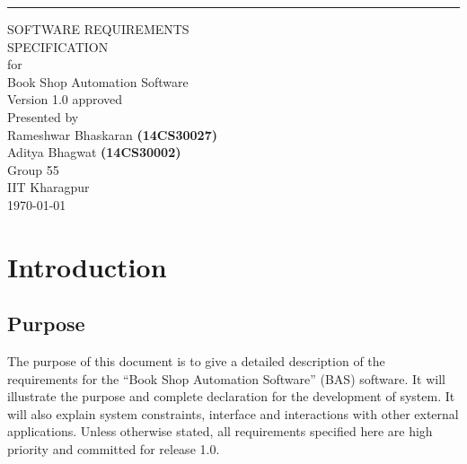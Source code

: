 \documentclass{scrreprt}
\date{}
\def\myversion{1.0 }
\begin{document}
\begin{flushright}
    \rule{16cm}{5pt}\vskip1cm
    \begin{bfseries}
        \Huge{SOFTWARE REQUIREMENTS\\ SPECIFICATION}\\
        \vspace{1.9cm}
        for\\
        \vspace{1.9cm}
        Book Shop Automation Software\\
        \vspace{1.9cm}
        \LARGE{Version \myversion approved}\\
        \vspace{1.8cm}
        Presented by\\
        \vspace{0.5cm}
        Rameshwar Bhaskaran \textbf{(14CS30027)} \\
        Aditya Bhagwat \textbf{(14CS30002)} \\
		Group 55 \\        
        \vspace{1.3cm}
        IIT Kharagpur\\    
       
        \today\\
    \end{bfseries}
\end{flushright}

\tableofcontents



\chapter{Introduction}

\section{Purpose}
The purpose of this document is to give a detailed description of the requirements for the “Book Shop Automation Software” (BAS) software. It will illustrate the purpose and complete declaration for the
 development of system. It will also explain system constraints, interface and interactions with other external applications. Unless
 otherwise stated, all requirements specified here are high priority and committed for release
 1.0.
\end{document}
